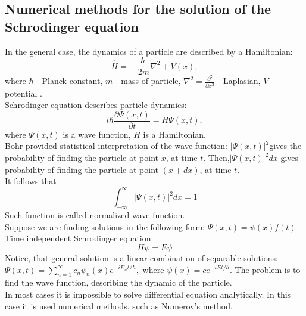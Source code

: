 \documentclass[a4paper, 12pt]{article}
\begin{document}
\subsection{Numerical methods for the solution of the Schrodinger equation} \label{sec:numerical}
In the general case, the dynamics of a particle are described by a Hamiltonian: 
\begin{equation}\label{hamiltonian}
	\hat{H} =- \dfrac{\hbar}{\ {2}{m}} \nabla^2  + V(x),
\end{equation}
where $\hbar$ - Planck constant, ${m}$ - mass of particle, $\nabla^2 = \frac{\partial^2}{\partial x^2}$ - Laplasian,  $V$ - potential .\\
Schrodinger equation describes particle dynamics:
\begin{equation}\label{schr_eq}
	i \hbar \frac{\partial \Psi(x, t)}{\partial t} = H \Psi(x,t),
\end{equation}
where $\Psi(x, t)$ is a wave function, $H$ is a Hamiltonian.\\
Bohr provided statistical interpretation of the wave function: $|\Psi(x,t)|^2 $gives the probability of finding the particle at point $x$, at time $t$. Then,$|\Psi(x,t)|^2 dx $ gives probability of finding the particle at point $(x+dx)$, at time $t.$\\
It follows that 
$$\int_{-\infty}^\infty |\Psi(x,t)|^2 dx = 1$$
Such function is called normalized wave function.\\
Suppose we are finding solutions in the following form: $\Psi(x, t) = \psi(x) f(t)$
Time independent Schrodinger equation:
\begin{equation}\label{t-indep}
	H \psi = E \psi
\end{equation}
Notice, that general solution is a linear combination of separable solutions: $\Psi(x,t) = \sum_{n=1}^\infty c_n \psi_n (x) e^{-i E_nt/ \hbar},$ where $\psi(x) = c e^{-iEt/ \hbar}.$
The problem is to find the wave function, describing the dynamic of the particle.\\
In most cases it is impossible to solve differential equation analytically. In this case it is used numerical methods, such as Numerov's method.
\end{document}
